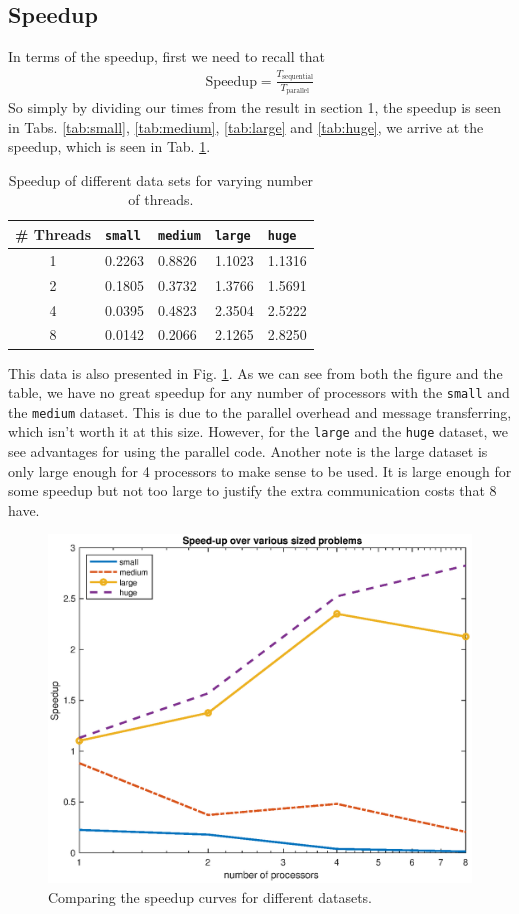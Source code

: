 \documentclass[a4paper,12pt]{article}
\theoremstyle{definition}
\theoremstyle{remark}
\begin{document}
	\subsection{Speedup}
	In terms of the speedup, first we need to recall that 
	\begin{align}
		\text{Speedup} = \frac{T_{\text{sequential}}}{T_{\text{parallel}}}\label{eqn:speedup}
	\end{align}
	So simply by dividing our times from the result in section 1, the speedup is seen in Tabs. \ref{tab:small}, \ref{tab:medium}, \ref{tab:large} and \ref{tab:huge}, we arrive at the speedup, which is seen in Tab. \ref{tab:speed}.
	\begin{table}[h]
		\centering
		\begin{tabular}{|c|l|l|l|l|}
			\hline
			\textbf{\# Threads}& \texttt{small} & \texttt{medium} & \texttt{large}   & \texttt{huge}\\
			\hline\hline
			1&  0.2263 & 0.8826 & 1.1023 & 1.1316 \\
			2&   0.1805 & 0.3732 & 1.3766 & 1.5691\\
			4&   0.0395 & 0.4823 & 2.3504 & 2.5222\\
			8&   0.0142 & 0.2066 &2.1265 & 2.8250\\\hline
		\end{tabular}
		\caption{Speedup of different data sets for varying number of threads.}
		\label{tab:speed}
	\end{table}
	
	This data is also presented in Fig. \ref{fig:speedup}. As we can see from both the figure and the table, we have no great speedup for any number of processors with the \texttt{small} and the \texttt{medium} dataset. This is due to the parallel overhead and message transferring, which isn't worth it at this size. However, for the \texttt{large} and the \texttt{huge} dataset, we see advantages for using the parallel code. Another note is the large dataset is only large enough for 4 processors to make sense to be used. It is large enough for some speedup but not too large to justify the extra communication costs that 8 have.
	\begin{figure}
		\centering
		\includegraphics[width=0.8\linewidth]{speedup}
		\caption{Comparing the speedup curves for different datasets.}
		\label{fig:speedup}
	\end{figure}
	
\end{document}

